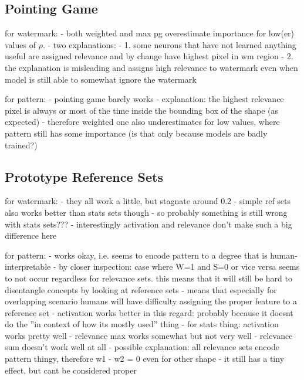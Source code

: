 \subsection{Pointing Game}
for watermark:
- both weighted and max pg overestimate importance for low(er) values of $\rho$. 
- two explanations: 
- 1. some neurons that have not learned anything useful are assigned relevance and by change have highest pixel in wm region
- 2. the explanation is misleading and assigns high relevance to watermark even when model is still able to somewhat ignore the watermark

for pattern:
- pointing game barely works
- explanation: the highest relevance pixel is always or most of the time inside the bounding box of the shape (as expected)
- therefore weighted one also underestimates for low values, where pattern still has some importance (is that only because models are badly trained?)

\subsection{Prototype Reference Sets}
for watermark:
- they all work a little, but stagnate around 0.2
- simple ref sets also works better than stats sets though
- so probably something is still wrong with stats sets???
- interestingly activation and relevance don't make such a big difference here

for pattern:
- works okay, i.e. seems to encode pattern to a degree that is human-interpretable
- by closer inspection: case where W=1 and S=0 or vice versa seems to not occur regardless for relevance sets. this means that it will still be hard to disentangle concepts by looking at reference sets
- means that especially for overlapping scenario humans will have difficulty assigning the proper feature to a reference set
- activation works better in this regard: probably because it doesnt do the ''in context of how its mostly used'' thing
- for stats thing: activation works pretty well
- relevance max works somewhat but not very well
- relevance sum doesn't work well at all
- possible explanation: all relevance sets encode pattern thingy, therefore w1 - w2 = 0 even for other shape
- it still has a tiny effect, but cant be considered proper



